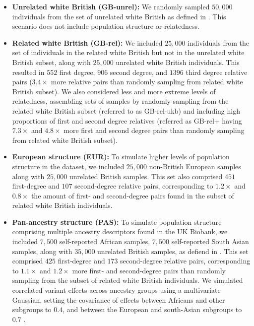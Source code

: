 \begin{itemize}
    \item \textbf{Unrelated white British (GB-unrel):}
    We randomly sampled $50{,}000$ individuals from the set of unrelated white British as defined in \cite{bycroft2018uk}.
    This scenario does not include population structure or relatedness.
    \item \textbf{Related white British (GB-rel):}
    We included $25,000$ individuals from the set of individuals in the related white British but not in the unrelated white British subset, along with $25,000$ unrelated white British individuals.
    This resulted in $552$ first degree, $906$ second degree, and $1396$ third degree relative pairs ($3.4 \times$ more relative pairs than randomly sampling from related white British subset). 
    We also considered less and more extreme levels of relatedness, assembling sets of samples by randomly sampling from the related white British subset (referred to as GB-rel-ukb) and including high proportions of first and second degree relatives (referred as GB-rel+ having $7.3 \times$ and $4.8 \times$ more first and second degree pairs than randomly sampling from related white British subset).
    \item \textbf{European structure (EUR):}
    To simulate higher levels of population structure in the dataset, we included $25{,}000$ non-British European samples \cite{bycroft2018uk} along with $25{,}000$ unrelated British samples. This set also comprised $451$ first-degree and $107$ second-degree relative pairs, corresponding to $1.2 \times$ and $0.8 \times$ the amount of first- and second-degree pairs found in the subset of related white British individuals.
    \item \textbf{Pan-ancestry structure (PAS):}
    To simulate population structure comprising multiple ancestry descriptors found in the UK Biobank, we included $7{,}500$ self-reported African samples, $7{,}500$ self-reported South Asian samples, along with $35{,}000$ unrelated British samples, as defiend in \cite{bycroft2018uk}.
    This set comprised $425$ first-degree and $173$ second-degree relative pairs, corresponding to $1.1 \times$ and $1.2 \times$ more first- and second-degree pairs than randomly sampling from the subset of related white British individuals.
    We simulated correlated variant effects across ancestry groups using a multivariate Gaussian, setting the covariance of effects between Africans and other subgroups to $0.4$, and between the European and south-Asian subgroups to $0.7$ \cite{ruan2022improving}.
\end{itemize}
